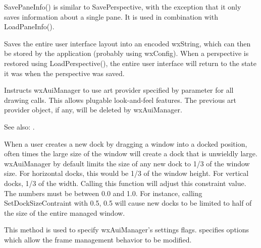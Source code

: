 SavePaneInfo() is similar to SavePerspective, with the exception that it only saves information about a single pane.  It is used in combination with LoadPaneInfo().

\label{wxauimanagersaveperspective}


Saves the entire user interface layout into an encoded wxString, which
can then be stored by the application (probably using wxConfig). When
a perspective is restored using LoadPerspective(), the entire user
interface will return to the state it was when the perspective was saved.

\label{wxauimanagersetartprovider}


Instructs wxAuiManager to use art provider specified by parameter
 for all drawing calls. This allows plugable
look-and-feel features. The previous art provider object, if any,
will be deleted by wxAuiManager.

See also: .


When a user creates a new dock by dragging a window into a docked position, often times the large size of the
window will create a dock that is unwieldly large.  wxAuiManager by default limits the size of any
new dock to 1/3 of the window size.  For horizontal docks, this would be 1/3 of the window height.  For
vertical docks, 1/3 of the width.  Calling this function will adjust this constraint value.  The numbers
must be between 0.0 and 1.0.  For instance, calling SetDockSizeContraint with 0.5, 0.5 will cause new
docks to be limited to half of the size of the entire managed window. 

\label{wxauimanagersetflags}


This method is used to specify wxAuiManager's settings flags. 
specifies options which allow the frame management behavior to be modified.

\label{wxauimanagersetmanagedwindow}


